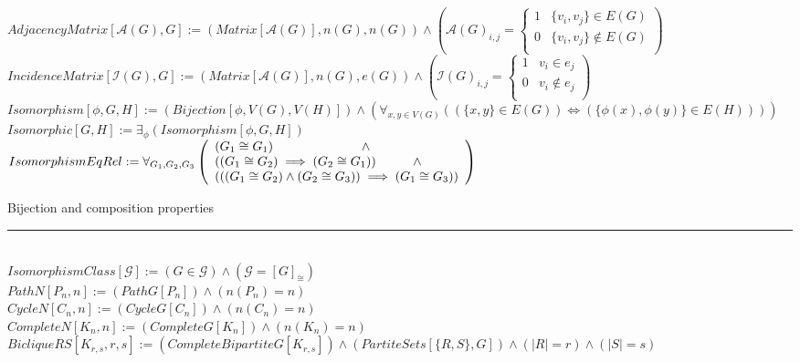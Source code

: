 \documentclass{book}
\newcommand{\abr}{:=}
\newcommand{\pr}[1]{\left(#1\right)}
\newcommand{\utup}[1]{\{#1\}}
\begin{document}
$AdjacencyMatrix[\mathcal{A}(G), G] \abr (Matrix[\mathcal{A}(G)], n(G), n(G)) \land \pr{\mathcal{A}(G)_{i, j} =
\begin{cases}
  1 & \utup{v_i, v_j} \in E(G) \\
  0 & \utup{v_i, v_j} \notin E(G) \\
\end{cases}}$ \\

$IncidenceMatrix[\mathcal{I}(G), G] \abr (Matrix[\mathcal{A}(G)], n(G), e(G)) \land \pr{\mathcal{I}(G)_{i, j} =
\begin{cases}
  1 & v_i \in e_j \\
  0 & v_i \notin e_j \\
\end{cases}}$ \\

$Isomorphism[\phi, G, H] \abr (Bijection[\phi, V(G), V(H)]) \land (\forall_{x, y \in V(G)}((\utup{x, y} \in E(G)) \iff (\utup{\phi(x), \phi(y)} \in E(H))))$ \\
$Isomorphic[G, H] \abr \exists_{\phi}(Isomorphism[\phi, G, H])$ \\

$IsomorphismEqRel \abr \forall_{G_1, G_2, G_3}
\left(\begin{array}{ll}
  (G_1 \cong G_1) \hfill \land \hfill \\
  ((G_1 \cong G_2) \implies (G_2 \cong G_1)) \hfill \land \hfill \\
  (((G_1 \cong G_2) \land (G_2 \cong G_3)) \implies (G_1 \cong G_3)) \\
\end{array}\right)$
\begin{enumerate}
  \lit Bijection and composition properties
\end{enumerate} \vspace{.75mm} \hrule \vspace{.75mm} \ \\
$IsomorphismClass[\mathcal{G}] \abr (G \in \mathcal{G}) \land (\mathcal{G} = [G]_{\cong})$ \\

$PathN[P_n, n] \abr (PathG[P_n]) \land (n(P_n) = n)$ \\
$CycleN[C_n, n] \abr (CycleG[C_n]) \land (n(C_n) = n)$ \\
$CompleteN[K_n, n] \abr (CompleteG[K_n]) \land (n(K_n) = n)$ \\
$BicliqueRS[K_{r, s}, r, s] \abr (CompleteBipartiteG[K_{r, s}]) \land (PartiteSets[\{R, S\}, G]) \land (|R| = r) \land (|S| = s)$ \\
\end{document}
